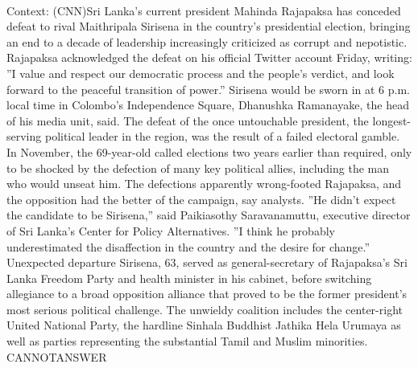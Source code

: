\documentclass[11pt,a4paper, onecolumn]{article}
\begin{document}
\\ Context: (CNN)Sri Lanka's current president Mahinda Rajapaksa has conceded defeat to rival Maithripala Sirisena in the country's presidential election, bringing an end to a decade of leadership increasingly criticized as corrupt and nepotistic. Rajapaksa acknowledged the defeat on his official Twitter account Friday, writing: ''I value and respect our democratic process and the people's verdict, and look forward to the peaceful transition of power.'' Sirisena would be sworn in at 6 p.m. local time in Colombo's Independence Square, Dhanushka Ramanayake, the head of his media unit, said. The defeat of the once untouchable president, the longest-serving political leader in the region, was the result of a failed electoral gamble. In November, the 69-year-old called elections two years earlier than required, only to be shocked by the defection of many key political allies, including the man who would unseat him. The defections apparently wrong-footed Rajapaksa, and the opposition had the better of the campaign, say analysts. ''He didn't expect the candidate to be Sirisena,'' said Paikiasothy Saravanamuttu, executive director of Sri Lanka's Center for Policy Alternatives. ''I think he probably underestimated the disaffection in the country and the desire for change.'' Unexpected departure Sirisena, 63, served as general-secretary of Rajapaksa's Sri Lanka Freedom Party and health minister in his cabinet, before switching allegiance to a broad opposition alliance that proved to be the former president's most serious political challenge. The unwieldy coalition includes the center-right United National Party, the hardline Sinhala Buddhist Jathika Hela Urumaya as well as parties representing the substantial Tamil and Muslim minorities. CANNOTANSWER
\end{document}
